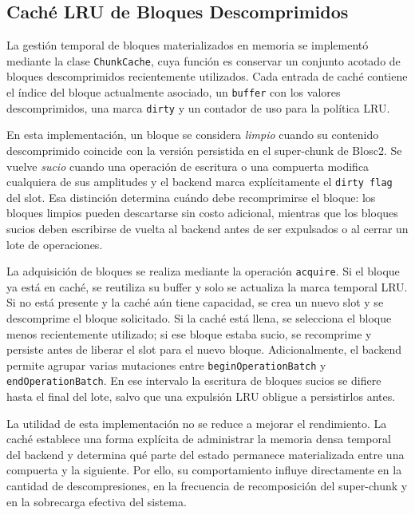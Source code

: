\subsection{Caché LRU de Bloques Descomprimidos}

La gestión temporal de bloques materializados en memoria se implementó mediante la
clase \texttt{ChunkCache}, cuya función es conservar un conjunto acotado de bloques
descomprimidos recientemente utilizados. Cada entrada de caché contiene el índice del
bloque actualmente asociado, un \texttt{buffer} con los valores descomprimidos, una marca
\texttt{dirty} y un contador de uso para la política LRU.

En esta implementación, un bloque se considera \textit{limpio} cuando su contenido
descomprimido coincide con la versión persistida en el super-chunk de Blosc2. Se vuelve
\textit{sucio} cuando una operación de escritura o una compuerta modifica cualquiera de
sus amplitudes y el backend marca explícitamente el \texttt{dirty flag} del slot. Esa
distinción determina cuándo debe recomprimirse el bloque: los bloques limpios pueden
descartarse sin costo adicional, mientras que los bloques sucios deben escribirse de vuelta
al backend antes de ser expulsados o al cerrar un lote de operaciones.

La adquisición de bloques se realiza mediante la operación \texttt{acquire}. Si el bloque ya
está en caché, se reutiliza su buffer y solo se actualiza la marca temporal LRU. Si no está
presente y la caché aún tiene capacidad, se crea un nuevo slot y se descomprime el bloque
solicitado. Si la caché está llena, se selecciona el bloque menos recientemente utilizado;
si ese bloque estaba sucio, se recomprime y persiste antes de liberar el slot para el nuevo
bloque. Adicionalmente, el backend permite agrupar varias mutaciones entre
\texttt{beginOperationBatch} y \texttt{endOperationBatch}. En ese intervalo la escritura de
bloques sucios se difiere hasta el final del lote, salvo que una expulsión LRU obligue a
persistirlos antes.

La utilidad de esta implementación no se reduce a mejorar el rendimiento. La caché
establece una forma explícita de administrar la memoria densa temporal del backend y
determina qué parte del estado permanece materializada entre una compuerta y la
siguiente. Por ello, su comportamiento influye directamente en la cantidad de
descompresiones, en la frecuencia de recomposición del super-chunk y en la sobrecarga
efectiva del sistema.
